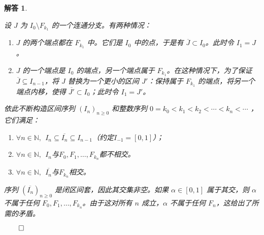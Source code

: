 \documentclass[12pt,UTF8]{ctexbook}
\theoremstyle{exercisestyle}
\theoremstyle{solutionstyle}
\newtheorem*{solution*}{解答}
\newenvironment{solution}
  {\begin{solution*}}
  {\hfill\ensuremath{\qed}\end{solution*}}
\begin{document}
\begin{solution}
\begin{subquestions}
    设 \( J \) 为 \( I_0 \setminus F_{k_1} \) 的一个连通分支。有两种情况：
    \begin{enumerate}
      \item \( J \) 的两个端点都在 \( F_{k_1} \) 中。它们是 \( I_0 \) 中的点，于是有 \(\overline{J} \subset I_0\)。此时令 \( I_1 = J \)。
      \item \( J \) 的一个端点是 \( I_0 \) 的端点，另一个端点属于 \( F_{k_1} \)。在这种情况下，为了保证$\overline{J}\subseteq I_{n-1}$，将 \( J \) 替换为一个更小的区间 \( J' \)：保持属于 \( F_{k_1} \) 的端点，将另一个端点内移，使得 \(\overline{J'} \subset I_0\)；此时令 \( I_1 = J' \)。
    \end{enumerate}
    依此不断构造区间序列 \((I_n)_{n\geqslant 0}\) 和整数序列 \(0 = k_0 < k_1 < k_2 < \cdots < k_n < \cdots\) ，它们满足：
    \begin{enumerate}
      \item $\forall n\in\mathbb{N},\;\, I_n \subseteq \overline{I_n} \subseteq I_{n-1} $（约定$I_{-1} = [0,1]$）；
      \item $\forall n\in\mathbb{N},\;\,I_n$与$F_0, F_1, \ldots, F_{k_n}$都不相交。
      \item $\forall n\in\mathbb{N},\;\,\overline{I_n}$与$F_{k_n}$相交。
    \end{enumerate}

    序列 \((\overline{I_n})_{n\geqslant 0}\) 是闭区间套，因此其交集非空。如果 \(\alpha \in [0,1]\) 属于其交，则 \(\alpha\) 不属于任何 \(F_0, F_1, \ldots, F_{k_n}\)。由于这对所有 \(n\) 成立，\(\alpha\) 不属于任何 \(F_n\)，这给出了所需的矛盾。
  \end{subquestions}

\end{solution}
\end{document}
